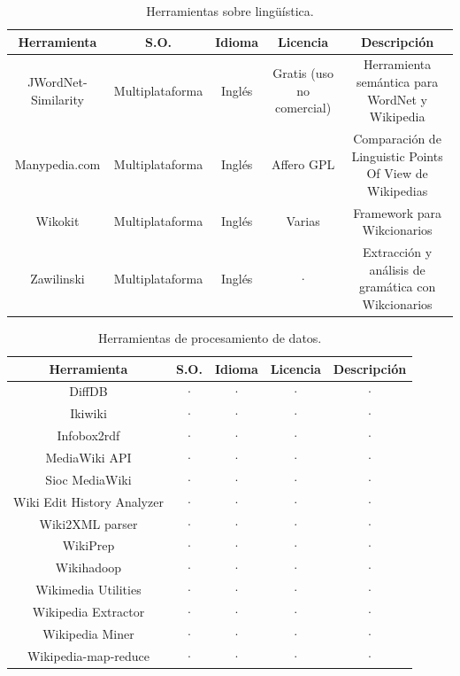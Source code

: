 \documentclass[11pt,onecolumn]{article}
\begin{document}
\begin{table}
\centering
\begin{tabular}{| c | c | c | c | c |}
\hline
\textbf{Herramienta} & \textbf{S.O.} & \textbf{Idioma} & \textbf{Licencia} & \textbf{Descripción} \\
\hline
JWordNet-Similarity & Multiplataforma & Inglés & Gratis (uso no comercial) & Herramienta semántica para WordNet y Wikipedia \\ \hline 
Manypedia.com & Multiplataforma & Inglés & Affero GPL & Comparación de Linguistic Points Of View de Wikipedias \\ \hline 
Wikokit & Multiplataforma & Inglés & Varias & Framework para Wikcionarios \\ \hline 
Zawilinski & Multiplataforma & Inglés & · & Extracción y análisis de gramática con Wikcionarios \\ \hline 
\end{tabular}
\caption{Herramientas sobre lingüística.}
\label{tab:languagetoolstable}
\end{table}


\begin{table}
\centering
\begin{tabular}{| c | c | c | c | c |}
\hline
\textbf{Herramienta} & \textbf{S.O.} & \textbf{Idioma} & \textbf{Licencia} & \textbf{Descripción} \\
\hline
DiffDB & · & · & · & · \\ \hline 
Ikiwiki & · & · & · & · \\ \hline 
Infobox2rdf & · & · & · & · \\ \hline 
MediaWiki API & · & · & · & · \\ \hline 
Sioc MediaWiki & · & · & · & · \\ \hline 
Wiki Edit History Analyzer & · & · & · & · \\ \hline 
Wiki2XML parser & · & · & · & · \\ \hline 
WikiPrep & · & · & · & · \\ \hline 
Wikihadoop & · & · & · & · \\ \hline 
Wikimedia Utilities & · & · & · & · \\ \hline 
Wikipedia Extractor & · & · & · & · \\ \hline 
Wikipedia Miner & · & · & · & · \\ \hline 
Wikipedia-map-reduce & · & · & · & · \\ \hline 
\end{tabular}
\caption{Herramientas de procesamiento de datos.}
\label{tab:dataprocessingtoolstable}
\end{table}
\end{document}
